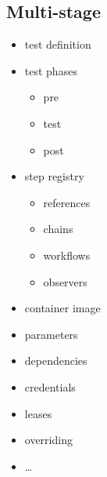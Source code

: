 \subsection{Multi-stage}

\begin{frame}
    \autotitle
    \begin{multicols}{2}
        \begin{itemize}
            \item test definition
            \item test phases
                \begin{itemize}
                    \item pre
                    \item test
                    \item post
                \end{itemize}
            \item step registry
                \begin{itemize}
                    \item references
                    \item chains
                    \item workflows
                    \item observers
                \end{itemize}
            \item container image
            \item parameters
            \item dependencies
            \item credentials
            \item leases
            \item overriding
            \item \ldots
        \end{itemize}
    \end{multicols}
\end{frame}


